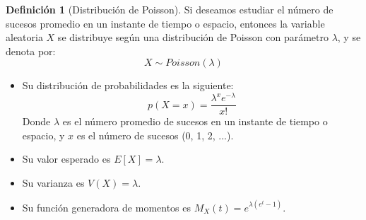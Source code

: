 \documentclass{article}
\theoremstyle{definition}
\newtheorem{definition}{Definición}[section]
\theoremstyle{plain}
\theoremstyle{remark}
\begin{document}
\begin{definition}[Distribución de Poisson]
Si deseamos estudiar el número de sucesos promedio en un instante de tiempo o espacio, entonces la variable aleatoria $X$ se distribuye según una distribución de Poisson con parámetro $\lambda$, y se denota por:
\[
X \sim Poisson(\lambda)
\]

\begin{itemize}
\item Su distribución de probabilidades es la siguiente:
\[
p(X = x) = \frac{\lambda^x e^{-\lambda}}{x!}
\]
Donde $\lambda$ es el número promedio de sucesos en un instante de tiempo o espacio, y $x$ es el número de sucesos (0, 1, 2, ...).
\item Su valor esperado es $E[X] = \lambda$.
\item Su varianza es $V(X) = \lambda$.
\item Su función generadora de momentos es $M_X(t) = e^{\lambda (e^{t} - 1)}$.
\end{itemize}

\end{definition}
\end{document}
